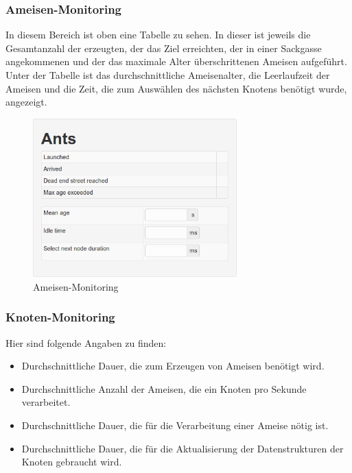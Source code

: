 \subsubsection{Ameisen-Monitoring}
\label{sec:ameisen-monitoring}

In diesem Bereich ist oben eine Tabelle zu sehen.
In dieser ist jeweils die Gesamtanzahl der erzeugten, der das Ziel erreichten, der in einer Sackgasse angekommenen und der das maximale Alter überschrittenen Ameisen aufgeführt.
Unter der Tabelle ist das durchschnittliche Ameisenalter, die Leerlaufzeit der Ameisen und die Zeit, die zum Auswählen des nächsten Knotens benötigt wurde, angezeigt.

\begin{figure}[htbp]
  \centering
  \includegraphics[width=0.7\textwidth]{Bilder/Ameisen-Monitoring.png}
  \caption{Ameisen-Monitoring}
  \label{fig:ameisen-monitoring}
\end{figure}

\subsubsection{Knoten-Monitoring}
\label{sec:knoten-monitoring}

Hier sind folgende Angaben zu finden:

\begin{itemize}
  \item Durchschnittliche Dauer, die zum Erzeugen von Ameisen benötigt wird.
  \item Durchschnittliche Anzahl der Ameisen, die ein Knoten pro Sekunde verarbeitet.
  \item Durchschnittliche Dauer, die für die Verarbeitung einer Ameise nötig ist.
  \item Durchschnittliche Dauer, die für die Aktualisierung der Datenstrukturen der Knoten gebraucht wird.
\end{itemize}

